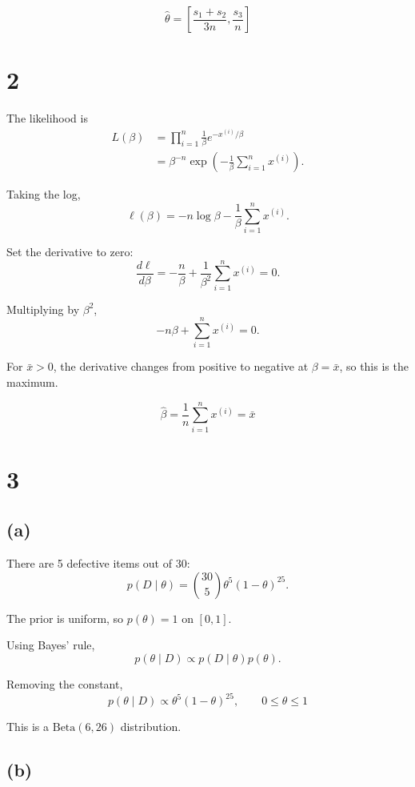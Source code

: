 \documentclass[11pt]{article}
\begin{document}
\[
\boxed{
\hat\theta=
\left[\frac{s_1+s_2}{3n},\frac{s_3}{n}\right]
}
\]

\section*{2}

The likelihood is
\[
\begin{aligned}
L(\beta)
&=\prod_{i=1}^{n}\frac{1}{\beta}e^{-x^{(i)}/\beta}\\
&=\beta^{-n}\exp\left(
-\frac{1}{\beta}\sum_{i=1}^{n}x^{(i)}
\right).
\end{aligned}
\]

Taking the log,
\[
\ell(\beta)
=-n\log\beta-\frac{1}{\beta}
\sum_{i=1}^{n}x^{(i)}.
\]

Set the derivative to zero:
\[
\frac{d\ell}{d\beta}
=-\frac{n}{\beta}
+\frac{1}{\beta^2}\sum_{i=1}^{n}x^{(i)}=0.
\]

Multiplying by $\beta^2$,
\[
-n\beta+\sum_{i=1}^{n}x^{(i)}=0.
\]

For $\bar{x}>0$, the derivative changes from
positive to negative at $\beta=\bar{x}$,
so this is the maximum.

\[
\boxed{
\hat\beta=\frac{1}{n}\sum_{i=1}^{n}x^{(i)}
=\bar{x}
}
\]

\section*{3}

\subsection*{(a)}

There are 5 defective items out of 30:
\[
p(D\mid\theta)
=\binom{30}{5}\theta^5(1-\theta)^{25}.
\]

The prior is uniform, so $p(\theta)=1$ on $[0,1]$.

Using Bayes' rule,
\[
p(\theta\mid D)\propto p(D\mid\theta)p(\theta).
\]

Removing the constant,
\[
\boxed{
p(\theta\mid D)\propto
\theta^5(1-\theta)^{25},
\qquad 0\leq\theta\leq1
}
\]

This is a $\mathrm{Beta}(6,26)$ distribution.

\subsection*{(b)}
\end{document}
